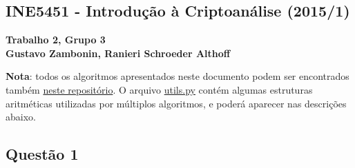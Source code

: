 \documentclass{article}
\begin{document}
\begin{center}
    \section*{INE5451 - Introdução à Criptoanálise (2015/1)}
    \textbf{
        Trabalho 2, Grupo 3 \\
        Gustavo Zambonin, Ranieri Schroeder Althoff
    }
\end{center}

\textbf{Nota}: todos os algoritmos apresentados neste documento podem ser
encontrados também \href{https://github.com/zambonin/ufsc-ine5451}{neste
repositório}. \break O arquivo
\href{https://raw.githubusercontent.com/zambonin/UFSC-INE5451/master/modern/utils.py}{utils.py}
contém algumas estruturas aritméticas utilizadas por múltiplos algoritmos, e
poderá aparecer nas descrições abaixo.

\subsection*{Questão 1}
\end{document}
